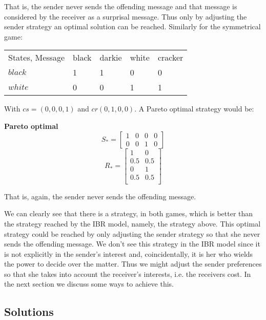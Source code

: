 \documentclass[10]{article}
\begin{document}
That is, the sender never sends the offending message and that message is considered by the receiver as a surprisal message. Thus only by adjusting the sender strategy an optimal solution can be reached. Similarly for the symmetrical game:

\begin{table}[h]
\centering
\begin{tabular}{lllll}
States, Message & black & darkie & white & cracker \\
$black$  & 1      & 1    & 0        & 0   \\
$white$  & 0     & 0   & 1       & 1
\end{tabular}
\end{table}

With $cs=(0,0,0,1)$ and $cr(0,1,0,0)$. A Pareto optimal strategy would be:

\textbf{Pareto optimal}\\
\begin{equation*}
S_*=
\begin{bmatrix}
1 & 0 & 0 & 0\\
0 & 0 & 1 & 0
\end{bmatrix}
\end{equation*}
\begin{equation*}
R_*=
\begin{bmatrix}
1 & 0\\
0.5 & 0.5 \\
0 & 1\\
0.5 & 0.5 \\
\end{bmatrix}
\end{equation*}

That is, again, the sender never sends the offending message.

We can clearly see that there is a strategy, in both games, which is better than the strategy reached by the IBR model, namely, the strategy above. This optimal strategy could be reached by only adjusting the sender strategy so that she never sends the offending message. We don't see this strategy in the IBR model since it is not explicitly in the sender's interest and, coincidentally, it is her who wields the power to decide over the matter. Thus we might adjust the sender preferences so that she takes into account the receiver's interests, i.e. the receivers cost. In the next section we discuss some ways to achieve this.\\

\subsection{Solutions}
\end{document}
